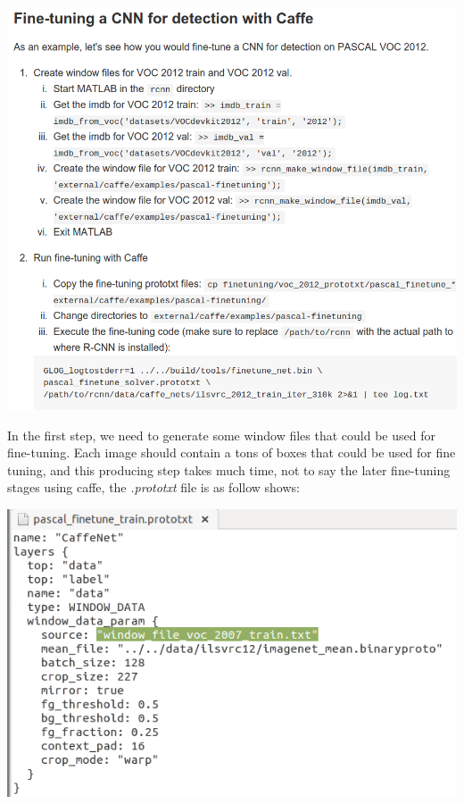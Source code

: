 \documentclass[a4]{article}
\begin{document}
\begin{center}
\includegraphics[scale=0.3]{cost_p1.png}
\end{center}

In the first step, we need to generate some window files that could be used for fine-tuning. Each image should contain a tons of boxes that could be used for fine tuning, and this producing step takes much time, not to say the later fine-tuning stages using caffe, the \emph{.prototxt} file is as follow shows:

\begin{center}
\includegraphics[scale=0.3]{cost_p2.png}
\end{center}
\end{document}
